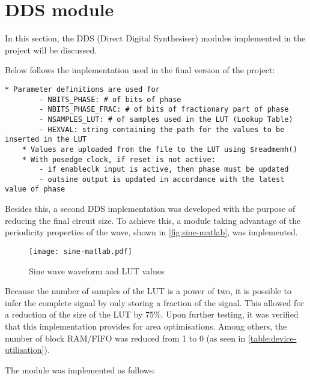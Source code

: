 \section{DDS module}\label{sec:dds-module}

In this section, the DDS (Direct Digital Synthesiser) modules implemented in the project will be discussed.

Below follows the implementation used in the final version of the project:
\begin{lstlisting}[caption=Pseudo-code for final DDS implementation]
	* Parameter definitions are used for
		- NBITS_PHASE: # of bits of phase
		- NBITS_PHASE_FRAC: # of bits of fractionary part of phase
		- NSAMPLES_LUT: # of samples used in the LUT (Lookup Table)
		- HEXVAL: string containing the path for the values to be inserted in the LUT
	* Values are uploaded from the file to the LUT using $readmemh()
	* With posedge clock, if reset is not active:
		- if enableclk input is active, then phase must be updated
		- outsine output is updated in accordance with the latest value of phase
\end{lstlisting}

Besides this, a second DDS implementation was developed with the purpose of reducing the final circuit size. To achieve this, a module taking advantage of the periodicity properties of the wave, shown in \autoref{fig:sine-matlab}, was implemented.

\begin{figure}[!h]
\centering
\texttt{[image: sine-matlab.pdf]}
\caption{Sine wave waveform and LUT values}\label{fig:sine-matlab}
\end{figure}


Because the number of samples of the LUT is a power of two, it is possible to infer the complete signal by only storing a fraction of the signal. This allowed for a reduction of the size of the LUT by 75\%. Upon further testing, it was verified that this implementation provides for area optimisations. Among others, the number of block RAM/FIFO was reduced from 1 to 0 (as seen in \autoref{table:device-utilisation}).

The module was implemented as follows:

